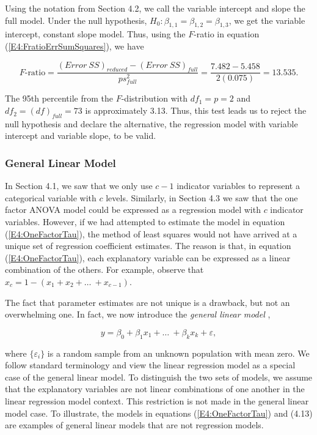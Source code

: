Using the notation from Section 4.2, we call the variable intercept
and slope the full model. Under the null hypothesis, $H_0:
\beta_{1,1}=\beta_{1,2}=\beta_{1,3}$, we get the variable intercept,
constant slope model. Thus, using the $F$-ratio in equation
(\ref{E4:FratioErrSumSquares}), we have

\begin{equation*}
F\text{-ratio}=\frac{(Error~SS)_{reduced}-(Error~SS)_{full}}{ps_{full}^{2}}=\frac{{7.482-5.458}}{2(0.075)}=13.535.
\end{equation*}

\noindent The 95th percentile from the $F$-distribution with
$df_1=p=2$ and $df_2=(df)_{full}=73$ is approximately 3.13. Thus,
this test leads us to reject the null hypothesis and declare the
alternative, the regression model with variable intercept and
variable slope, to be valid.

\linejed

\subsubsection*{General Linear Model}

In Section 4.1, we saw that we only use $c-1$ indicator variables to
represent a categorical variable with $c$ levels. Similarly, in
Section 4.3 we saw that the one factor ANOVA model could be
expressed as a regression model with $c$ indicator variables.
However, if we had attempted to estimate the model in equation
(\ref{E4:OneFactorTau}), the method of least squares would not have
arrived at a unique set of regression coefficient estimates. The
reason is that, in equation (\ref{E4:OneFactorTau}), each
explanatory variable can be expressed as a
linear combination of the others. For example, observe that $%
x_{c}=1-(x_1+x_2+\ldots \ +x_{c-1})$.

The fact that parameter estimates are not unique is a drawback, but
not an
overwhelming one. In fact, we now introduce the \textit{general linear model}%
,

\begin{equation} \label{E4:GeneralLinearModel}
y=\beta_0+\beta_1x_1+\ldots \ +\beta_kx_k + \varepsilon,
\end{equation}

\noindent where $\{\varepsilon_i\}$ is a random sample from an
unknown population with mean zero. We follow standard terminology
and view the linear regression model as a special case of the
general linear model. To distinguish the two sets of models, we
assume that the explanatory variables are not linear combinations of
one another in the linear regression model context. This restriction
is not made in the general linear model case. To illustrate, the
models in equations (\ref{E4:OneFactorTau}) and (4.13) are examples
of general linear models that are not regression models.

